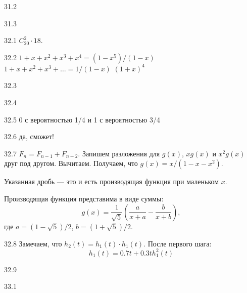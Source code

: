 \begin{solution}{{31.2}}
  
\end{solution}
\protect \hypertarget {soln:31.3}{}
\begin{solution}{{31.3}}
  
\end{solution}
\protect \hypertarget {soln:32.1}{}
\begin{solution}{{32.1}}
$C_{20}^2\cdot 18$.
\end{solution}
\protect \hypertarget {soln:32.2}{}
\begin{solution}{{32.2}}
  $1+x+x^2+x^3+x^4=(1-x^5)/(1-x)$
  $1+x+x^2+x^3+\ldots = 1/(1-x)$
  $(1+x)^4$
\end{solution}
\protect \hypertarget {soln:32.3}{}
\begin{solution}{{32.3}}
\end{solution}
\protect \hypertarget {soln:32.4}{}
\begin{solution}{{32.4}}
\end{solution}
\protect \hypertarget {soln:32.5}{}
\begin{solution}{{32.5}}
  0 с вероятностью 1/4 и 1 с вероятностью 3/4
\end{solution}
\protect \hypertarget {soln:32.6}{}
\begin{solution}{{32.6}}
  да, сможет!
\end{solution}
\protect \hypertarget {soln:32.7}{}
\begin{solution}{{32.7}}
$F_n = F_{n-1} + F_{n-2}$.
Запишем разложения для $g(x)$, $xg(x)$ и $x^2 g(x)$ друг под другом. Вычитаем. Получаем, что $g(x) = x/(1-x-x^2)$.

Указанная дробь — это и есть производящая функция при маленьком $x$.

Производящая функция представима в виде суммы:
\[
g(x) = \frac{1}{\sqrt{5}}\left( \frac{a}{x+a} - \frac{b}{x+b}  \right),
\]
где $a=(1-\sqrt{5})/2$, $b=(1+\sqrt{5})/2$.
\end{solution}
\protect \hypertarget {soln:32.8}{}
\begin{solution}{{32.8}}
Замечаем, что $h_2(t)=h_1(t)\cdot h_1(t)$. После первого шага:
\[
h_1(t) = 0.7t + 0.3th^2_1(t)
\]
\end{solution}
\protect \hypertarget {soln:32.9}{}
\begin{solution}{{32.9}}

\end{solution}
\protect \hypertarget {soln:33.1}{}
\begin{solution}{{33.1}}
\end{solution}
